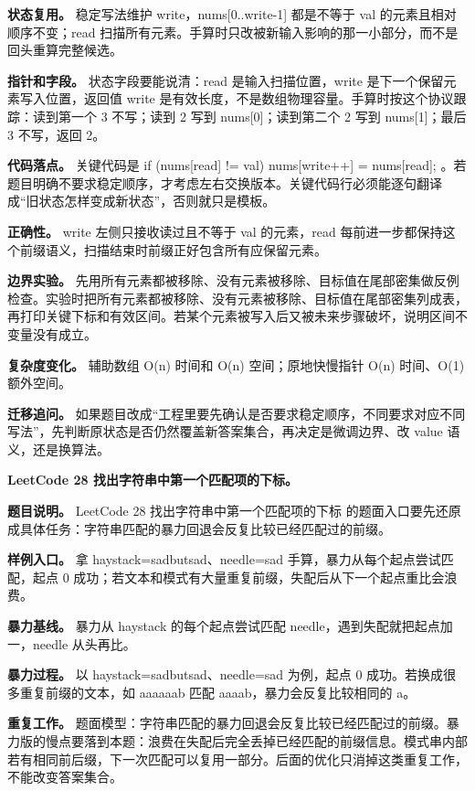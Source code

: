 \textbf{状态复用。} 稳定写法维护 write，nums[0..write-1] 都是不等于 val 的元素且相对顺序不变；read 扫描所有元素。手算时只改被新输入影响的那一小部分，而不是回头重算完整候选。

\textbf{指针和字段。} 状态字段要能说清：read 是输入扫描位置，write 是下一个保留元素写入位置，返回值 write 是有效长度，不是数组物理容量。手算时按这个协议跟踪：读到第一个 3 不写；读到 2 写到 nums[0]；读到第二个 2 写到 nums[1]；最后 3 不写，返回 2。

\textbf{代码落点。} 关键代码是 if (nums[read] != val) nums[write++] = nums[read]; 。若题目明确不要求稳定顺序，才考虑左右交换版本。关键代码行必须能逐句翻译成“旧状态怎样变成新状态”，否则就只是模板。

\textbf{正确性。} write 左侧只接收读过且不等于 val 的元素，read 每前进一步都保持这个前缀语义，扫描结束时前缀正好包含所有应保留元素。

\textbf{边界实验。} 先用所有元素都被移除、没有元素被移除、目标值在尾部密集做反例检查。实验时把所有元素都被移除、没有元素被移除、目标值在尾部密集列成表，再打印关键下标和有效区间。若某个元素被写入后又被未来步骤破坏，说明区间不变量没有成立。

\textbf{复杂度变化。} 辅助数组 O(n) 时间和 O(n) 空间；原地快慢指针 O(n) 时间、O(1) 额外空间。

\textbf{迁移追问。} 如果题目改成“工程里要先确认是否要求稳定顺序，不同要求对应不同写法”，先判断原状态是否仍然覆盖新答案集合，再决定是微调边界、改 value 语义，还是换算法。

\noindent\textbf{LeetCode 28 找出字符串中第一个匹配项的下标。}

\textbf{题目说明。} LeetCode 28 找出字符串中第一个匹配项的下标 的题面入口要先还原成具体任务：字符串匹配的暴力回退会反复比较已经匹配过的前缀。

\textbf{样例入口。} 拿 haystack=sadbutsad、needle=sad 手算，暴力从每个起点尝试匹配，起点 0 成功；若文本和模式有大量重复前缀，失配后从下一个起点重比会浪费。

\textbf{暴力基线。} 暴力从 haystack 的每个起点尝试匹配 needle，遇到失配就把起点加一，needle 从头再比。

\textbf{暴力过程。} 以 haystack=sadbutsad、needle=sad 为例，起点 0 成功。若换成很多重复前缀的文本，如 aaaaaab 匹配 aaaab，暴力会反复比较相同的 a。

\textbf{重复工作。} 题面模型：字符串匹配的暴力回退会反复比较已经匹配过的前缀。暴力版的慢点要落到本题：浪费在失配后完全丢掉已经匹配的前缀信息。模式串内部若有相同前后缀，下一次匹配可以复用一部分。后面的优化只消掉这类重复工作，不能改变答案集合。

